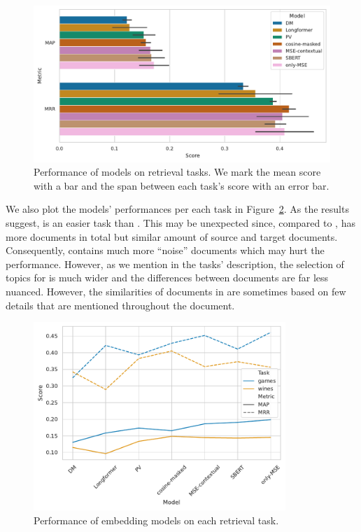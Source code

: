 \begin{figure}

  \includegraphics[width=\textwidth]{img/final_sims_evals.pdf}

  \caption{Performance of models on retrieval tasks. We mark the mean score
  with a bar and the span between each task's score with an error bar.}

  \label{fig:final_eval_sims}

\end{figure}

We also plot the models' performances per each task in
Figure~\ref{fig:final_eval_sims_per_task}. As the results suggest, 
is an easier task than . This may be unexpected since, compared to
,  has more documents in total but similar amount of
source and target documents. Consequently,  contains much more
``noise'' documents which may hurt the performance. However, as we mention in
the tasks' description, the selection of topics for  is much wider
and the differences between documents are far less nuanced. However, the
similarities of documents in  are sometimes based on few details
that are mentioned throughout the document.

\begin{figure}

  \centering
  \includegraphics[width=0.85\textwidth]{img/final_sims_evals_per_task.pdf}

  \caption{Performance of embedding models on each retrieval task.}

  \label{fig:final_eval_sims_per_task}

\end{figure}
